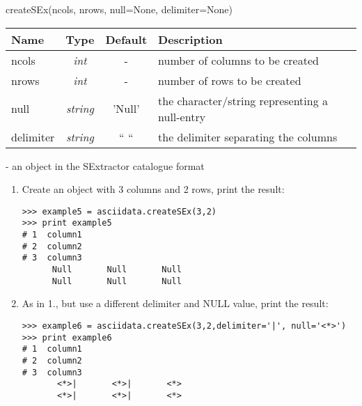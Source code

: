 createSEx(ncols, nrows, null=None, delimiter=None)

\begin{tabular}{lccl}
Name     & Type    & Default & Description \\ \hline
ncols    &{\it int}& - & number of columns to be created\\
nrows    &{\it int}& - & number of rows to be created\\
null     &{\it string}& 'Null' & the character/string representing a null-entry\\
delimiter&{\it string}& `` `` & the delimiter separating the columns \\
\end{tabular}

- an \ad object in the SExtractor catalogue format

\begin{enumerate}
\item Create an \ad object with 3 columns and 2 rows, print the result:
\begin{verbatim}
>>> example5 = asciidata.createSEx(3,2)
>>> print example5
# 1  column1
# 2  column2
# 3  column3
      Null       Null       Null
      Null       Null       Null
\end{verbatim}

\item As in 1., but use a different delimiter and NULL value, print the result:
\begin{verbatim}
>>> example6 = asciidata.createSEx(3,2,delimiter='|', null='<*>')
>>> print example6
# 1  column1
# 2  column2
# 3  column3
       <*>|       <*>|       <*>
       <*>|       <*>|       <*>
\end{verbatim}
\end{enumerate}

